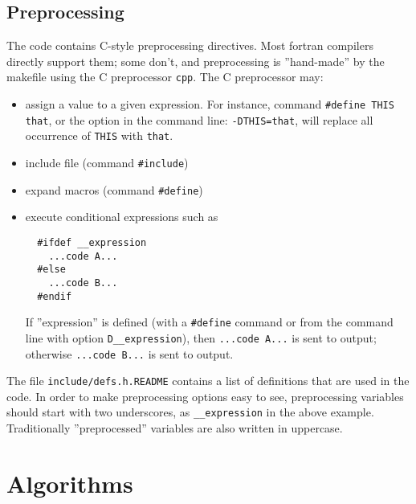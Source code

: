 \documentclass[12pt,a4paper]{article}
\begin{document}
\subsection{Preprocessing}
\label{SubSec:CPP}
The code contains C-style preprocessing directives. Most fortran
compilers directly support them; some don't, and preprocessing is
''hand-made'' by the makefile using the C preprocessor
\texttt{cpp}. The C preprocessor may: 
\begin{itemize}
\item assign a value to a given expression. For instance, command
  \texttt{\#define THIS that}, or the option in the command line:
  \texttt{-DTHIS=that}, will replace all occurrence of \texttt{THIS}
  with \texttt{that}. 
\item include file (command \texttt{\#include})
\item expand macros (command \texttt{\#define})
\item execute conditional expressions such as
\begin{verbatim}
  #ifdef __expression
    ...code A...
  #else
    ...code B...
  #endif
\end{verbatim}
If ''expression'' is defined (with a \texttt{\#define} command 
or from the command line with option \texttt{\-D\_\_expression}), 
then  \texttt{...code A...} is sent to output; otherwise 
\texttt{...code B...} is sent to output.

\end{itemize}
The file \texttt{include/defs.h.README} contains a list of definitions
that are used in the code. In order to make  preprocessing options
easy to see, preprocessing variables should start with  
two underscores, as \texttt{\_\_expression} in the above
example. Traditionally ''preprocessed'' variables are also written in
uppercase. 


\section{ Algorithms}
\end{document}
